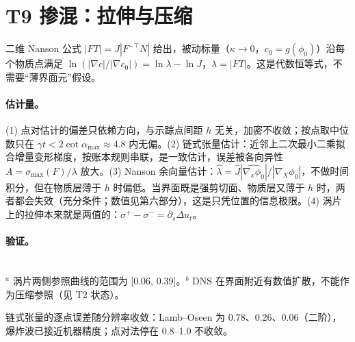 \section{T9 掺混：拉伸与压缩}

\begin{proposition}[梯度增长的精确分解]
二维 Nanson 公式 $|FT|=J|F^{-\top}N|$ 给出，被动标量（$\kappa\to0$，$c_0=g(\phi_0)$）沿每个物质点满足
$\ln(|\nabla c|/|\nabla c_0|)=\ln\lambda-\ln J$，$\lambda=|FT|$。这是代数恒等式，不需要“薄界面元”假设。
\end{proposition}

\paragraph{估计量。}(1) 点对估计的偏差只依赖方向，与示踪点间距 $h$ 无关，加密不收敛；按点取中位数只在 $\dot\gamma t<2\cot\alpha_{\max}\approx4.8$ 内无偏。(2) 链式张量估计：近邻上二次最小二乘拟合增量变形梯度，按账本规则串联，是一致估计，误差被各向异性 $A=\sigma_{\max}(F)/\lambda$ 放大。(3) Nanson 余向量估计：$\hat\lambda=\hat J|\widehat{\nabla_x\phi_0}|/|\nabla_X\phi_0|$，不做时间积分，但在物质层薄于 $h$ 时偏低。当界面既是强剪切面、物质层又薄于 $h$ 时，两者都会失效（充分条件；数值见第六部分），这是只凭位置的信息极限。(4) 涡片上的拉伸本来就是两值的：$\sigma^+-\sigma^-=\partial_s\Delta u_t$。

\paragraph{验证。}
\begin{center}\small
{}\\[0.2em]{\footnotesize $^a$ 涡片两侧参照曲线的范围为 [0.06, 0.39]。\quad $^b$ DNS 在界面附近有数值扩散，不能作为压缩参照（见 T2 状态）。}\end{center}
链式张量的逐点误差随分辨率收敛：Lamb–Oseen 为 0.78、0.26、0.06（二阶），爆炸波已接近机器精度；点对法停在 0.8–1.0 不收敛。

